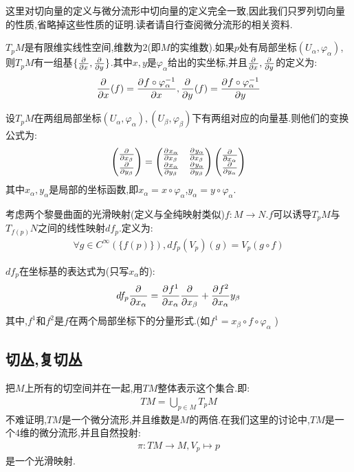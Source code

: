 这里对切向量的定义与微分流形中切向量的定义完全一致,因此我们只罗列切向量的性质,省略掉这些性质的证明.读者请自行查阅微分流形的相关资料.
\begin{proposition}
	$T_pM$是有限维实线性空间,维数为$2$(即$M$的实维数).如果$p$处有局部坐标$(U_\alpha,\varphi_\alpha)$,则$T_pM$有一组基$\{\frac{\partial^{} }{\partial {x}^{}},\frac{\partial^{} }{\partial {y}^{}}\}$.其中$x,y$是$\varphi_\alpha$给出的实坐标,并且$\frac{\partial^{} }{\partial {x}^{}},\frac{\partial^{} }{\partial {y}^{}}$的定义为:
	\begin{align*}
		\frac{\partial^{} }{\partial {x}^{}}(f)=\frac{\partial^{} f\circ \varphi_\alpha^{-1}}{\partial {x}^{}},\frac{\partial^{} }{\partial {y}^{}}(f)=\frac{\partial^{} f\circ \varphi_\alpha^{-1}}{\partial {y}^{}}
	\end{align*}
\end{proposition}
\begin{proposition}
	设$T_pM$在两组局部坐标$(U_\alpha,\varphi_\alpha),(U_\beta,\varphi_\beta)$下有两组对应的向量基.则他们的变换公式为:
	\begin{align*}
		\begin{pmatrix}
			\frac{\partial^{} }{\partial {x_\beta}^{}}\\
			\frac{\partial^{} }{\partial {y_\beta}^{}}
		\end{pmatrix}=\begin{pmatrix}
			\frac{\partial^{} x_\alpha}{\partial {x_\beta}^{}}&\frac{\partial^{} y_\alpha}{\partial {x_\beta}^{}}\\
			\frac{\partial^{} x_\alpha}{\partial {y_\beta}^{}}&\frac{\partial^{} y_\alpha}{\partial {y_\beta}^{}}\end{pmatrix}\begin{pmatrix}
				\frac{\partial^{} }{\partial {x_\alpha}^{}}\\
				\frac{\partial^{} }{\partial {y_\alpha}^{}}
			\end{pmatrix}
	\end{align*}
	其中$x_\alpha,y_\alpha$是局部的坐标函数,即$x_\alpha=x\circ \varphi_\alpha$,$y_\alpha=y \circ \varphi_\alpha$.
\end{proposition}
\begin{proposition}[切映射]
	考虑两个黎曼曲面的光滑映射(定义与全纯映射类似)$f:M \to N$.$f$可以诱导$T_pM$与$T_{f(p)}N$之间的线性映射$df_p$.定义为:
	\begin{align*}
		\forall g \in C^\infty(\{f(p)\}),df_p(V_p)(g)=V_p(g \circ f)
	\end{align*}

	$df_p$在坐标基的表达式为(只写$x_\alpha$的):
	\begin{align*}
		df_p \frac{\partial^{} }{\partial {x_\alpha}^{}}=\frac{\partial^{} f^1}{\partial {x_\alpha}^{}}\frac{\partial^{} }{\partial {x_\beta}^{}}+\frac{\partial^{} f^2}{\partial {x_\alpha}^{}}{y_\beta}
	\end{align*}
	其中,$f^1$和$f^2$是$f$在两个局部坐标下的分量形式.(如$f^1=x_\beta \circ f \circ \varphi_\alpha$ )
\end{proposition}
\subsection*{切丛,复切丛}
把$M$上所有的切空间并在一起,用$TM$整体表示这个集合.即:
\begin{align*}
	TM=\bigcup_{p \in M}T_pM
\end{align*}
不难证明,$TM$是一个微分流形,并且维数是$M$的两倍.在我们这里的讨论中,$TM$是一个4维的微分流形,并且自然投射:
\begin{align*}
	\pi:TM \to M,V_p \mapsto p
\end{align*}
是一个光滑映射.
